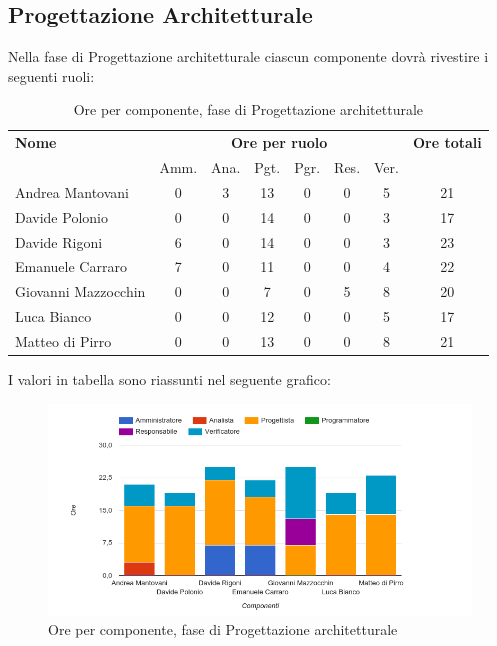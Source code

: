 \pagebreak
\subsection{Progettazione Architetturale}
Nella fase di Progettazione architetturale ciascun componente dovrà rivestire i seguenti ruoli:

\begin{table}[H]
\begin{tabular}{lccccccc}
\toprule
    \textbf{Nome}  & \multicolumn{6}{c}{\textbf{Ore per ruolo}} & \textbf{Ore totali} \\
     & Amm. & Ana. & Pgt. & Pgr. & Res. & Ver. & \\
    \midrule
    
	   Andrea Mantovani & 0 & 3 & 13 & 0 & 0 & 5 & 21 \\
         Davide Polonio & 0 & 0 & 14 & 0 & 0 & 3 & 17 \\
       	  Davide Rigoni & 6 & 0 & 14 & 0 & 0 & 3 & 23 \\
	   Emanuele Carraro & 7 & 0 & 11 & 0 & 0 & 4 & 22 \\
	Giovanni Mazzocchin & 0 & 0 & 7 & 0 & 5 & 8 & 20 \\
	        Luca Bianco & 0 & 0 & 12 & 0 & 0 & 5 & 17 \\
      	Matteo di Pirro & 0 & 0 & 13 & 0 & 0 & 8 & 21 \\
    
    \bottomrule
\end{tabular}
\caption{Ore per componente, fase di Progettazione architetturale}
\end{table}

I valori in tabella sono riassunti nel seguente grafico: \\ 

    \begin{figure}[H]
      \begin{center}
        \includegraphics[width=12cm]{res/img/orePerComponenteProgettazioneArchitetturale.png}
      \caption{Ore per componente, fase di Progettazione architetturale}
      \end{center} 
    \end{figure}    
    
